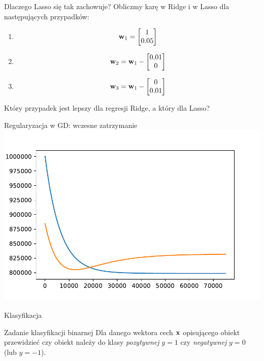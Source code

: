 \documentclass{sa}
\renewcommand{\vec}[1]{\ensuremath\mathbf{#1}}
\begin{document}
\begin{frame}{Dlaczego Lasso się tak zachowuje?}
Obliczmy karę w Ridge i w Lasso dla następujących przypadków:
\begin{enumerate}
\item \[ \vec{w}_1=\begin{bmatrix} 1 \\ 0.05 \end{bmatrix} \]
\pause
\item \[ \vec{w}_2=\vec{w}_1-\begin{bmatrix} 0.01 \\ 0 \end{bmatrix} \]
\pause
\item \[ \vec{w}_3=\vec{w}_1-\begin{bmatrix} 0 \\ 0.01 \end{bmatrix} \]
\end{enumerate}
\pause
\alert{Który przypadek jest lepszy dla regresji Ridge, a który dla Lasso?}
\end{frame}

\begin{frame}{Regularyzacja w GD: wczesne zatrzymanie}
\includegraphics[width=\textwidth]{earlystopping.pdf}
\end{frame}

\begin{frame}{Klasyfikacja}
\begin{block}{Zadanie klasyfikacji binarnej}
Dla danego wektora cech $\vec{x}$ opisującego obiekt przewidzieć czy obiekt należy do klasy \emph{pozytywnej} $y=1$ czy \emph{negatywnej} $y=0$ (lub $y=-1$).
\end{block}
\end{frame}
\end{document}
